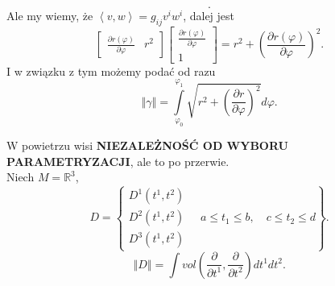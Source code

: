 \documentclass[../main.tex]{subfiles}
\begin{document}
\begin{przyklad}
\[.\]
Ale my wiemy, że $\left<v, w \right> = g_{ij} v^iw^i$, dalej jest
\[
    \begin{bmatrix} \frac{\partial r(\varphi)}{\partial \varphi}& r^2 \end{bmatrix} \begin{bmatrix} \frac{\partial r(\varphi)}{\partial \varphi} \\ 1 \end{bmatrix} = r^2 + \left( \frac{\partial r(\varphi)}{\partial \varphi}  \right) ^2
.\]
I w związku z tym możemy podać od razu
\[
    \left\Vert \gamma \right\Vert = \int\limits_{\varphi_0}^{\varphi_1}\sqrt{r^2 + \left( \frac{\partial r}{\partial \varphi}  \right) ^2} d\varphi
.\]
\end{przyklad}
W powietrzu wisi \textbf{NIEZALEŻNOŚĆ OD WYBORU PARAMETRYZACJI}, ale to po przerwie.\\
Niech $M = \mathbb{R}^3$,
\[
    D = \left\{ \begin{matrix}D^1(t^1, t^2)\\ D^2(t^1, t^2)\\ D^3(t^1, t^2)\end{matrix}\quad a\le t_1 \le b,\quad c \le t_2 \le d\right\}
.\]
\[
    \left\Vert D \right\Vert = \int\limits vol\left( \frac{\partial }{\partial t^1} , \frac{\partial }{\partial t^2}  \right) dt^1dt^2
.\]
\end{document}
